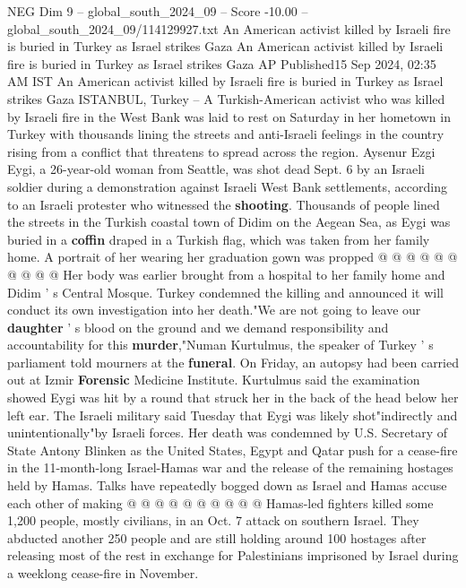 \begin{textsample}{NEG Dim 9 – global\_south\_2024\_09 – Score -10.00 – global\_south\_2024\_09/114129927.txt}  \label{ex:f9_neg_102}
An American activist killed by Israeli fire is buried in Turkey as Israel strikes Gaza An American activist killed by Israeli fire is buried in Turkey as Israel strikes Gaza AP Published15 Sep 2024, 02:35 AM IST An American activist killed by Israeli fire is buried in Turkey as Israel strikes Gaza ISTANBUL, Turkey -- A Turkish-American activist who was killed by Israeli fire in the West Bank was laid to rest on Saturday in her hometown in Turkey with thousands lining the streets and anti-Israeli feelings in the country rising from a conflict that threatens to spread across the region.
Aysenur Ezgi Eygi, a 26-year-old woman from Seattle, was shot dead Sept. 6 by an Israeli soldier during a demonstration against Israeli West Bank settlements, according to an Israeli protester who witnessed the \textbf{shooting}.
Thousands of people lined the streets in the Turkish coastal town of Didim on the Aegean Sea, as Eygi was buried in a \textbf{coffin} draped in a Turkish flag, which was taken from her family home.
A portrait of her wearing her graduation gown was propped @ @ @ @ @ @ @ @ @ @ Her body was earlier brought from a hospital to her family home and Didim ' s Central Mosque.
Turkey condemned the killing and announced it will conduct its own investigation into her death."We are not going to leave our \textbf{daughter} ' s blood on the ground and we demand responsibility and accountability for this \textbf{murder},"Numan Kurtulmus, the speaker of Turkey ' s parliament told mourners at the \textbf{funeral}.
On Friday, an autopsy had been carried out at Izmir \textbf{Forensic} Medicine Institute.
Kurtulmus said the examination showed Eygi was hit by a round that struck her in the back of the head below her left ear.
The Israeli military said Tuesday that Eygi was likely shot"indirectly and unintentionally"by Israeli forces.
Her death was condemned by U.S.
Secretary of State Antony Blinken as the United States, Egypt and Qatar push for a cease-fire in the 11-month-long Israel-Hamas war and the release of the remaining hostages held by Hamas.
Talks have repeatedly bogged down as Israel and Hamas accuse each other of making @ @ @ @ @ @ @ @ @ @ Hamas-led fighters killed some 1,200 people, mostly civilians, in an Oct. 7 attack on southern Israel.
They abducted another 250 people and are still holding around 100 hostages after releasing most of the rest in exchange for Palestinians imprisoned by Israel during a weeklong cease-fire in November.

\end{textsample}
